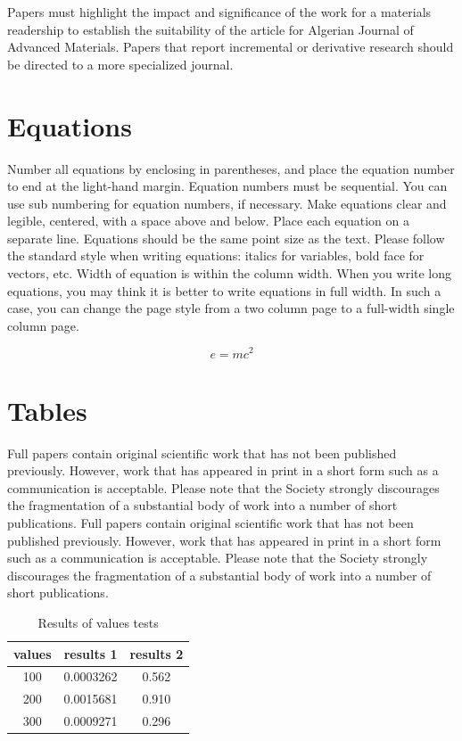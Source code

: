 \documentclass[times,twoside,5p]{ajam}
\begin{document}
Papers must highlight the impact and significance of the work for a materials readership to establish the suitability of the article for Algerian Journal of Advanced Materials. Papers that report incremental or derivative research should be directed to a more specialized journal.

\section{Equations}

Number all equations by enclosing in parentheses, and place the equation number to end at the light-hand margin. Equation numbers must be sequential. You can use sub numbering for equation numbers, if necessary. Make equations clear and legible, centered, with a space above and below. Place each equation on a separate line. Equations should be the same point size as the text. Please follow the standard style when writing equations: italics for variables, bold face for vectors, etc. Width of equation is within the column width. When you write long equations, you may think it is better to write equations in full width. In such a case, you can change the page style from a two column page to a full-width single column page.

\begin{equation}
\label{eq:emc}
e = mc^2
\end{equation}

\section{Tables}
Full papers contain original scientific work that has not been published previously. However, work that has appeared in print in a short form such as a communication is  acceptable. Please note that the Society strongly discourages the fragmentation of a substantial body of work into a number of short publications. Full papers contain original scientific work that has not been published previously. However, work that has appeared in print in a short form such as a communication is  acceptable. Please note that the Society strongly discourages the fragmentation of a substantial body of work into a number of short publications.

\begin{table}[h]
\centering
\begin{tabular}{c| c c}
\textbf{values} & \textbf{results 1} & \textbf{results 2}\\
\hline
100 & 0.0003262 & 0.562 \\
200 & 0.0015681 & 0.910 \\
300 & 0.0009271 & 0.296 \\
\end{tabular}
\caption{Results of values tests}
\end{table}
\end{document}
